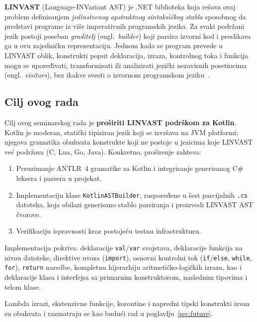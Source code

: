 \documentclass[a4paper]{article}
\begin{document}
\vspace{2px}
\textbf{LINVAST} (Language-INVariant AST) je .NET biblioteka koja rešava
ovaj problem definisanjem \emph{jedinstvenog apstraktnog sintaksičkog stabla}
sposobnog da predstavi programe iz više imperativnih programskih jezika. Za svaki
podržani jezik postoji poseban \emph{graditelj} (engl.\ \emph{builder}) koji
parsira izvorni kod i preslikava ga u ovu zajedničku reprezentaciju. Jednom kada
se program prevede u LINVAST oblik, konstrukti poput deklaracija, izraza,
kontrolnog toka i funkcija mogu se upoređivati, transformisati ili analizirati
jezički nezavisnih posetiocima (engl.\ \emph{visitors}), bez ikakve svesti o
izvornom programskom jeziku~\cite{ristovic2020}.

\subsection{Cilj ovog rada}

Cilj ovog seminarskog rada je \textbf{proširiti LINVAST podrškom za Kotlin}.
Kotlin je moderan, statički tipiziran jezik koji se izvršava na JVM platformi;
njegova gramatika obuhvata konstrukte koji ne postoje u jezicima koje LINVAST
već podržava (C, Lua, Go, Java). Konkretno, proširenje zahteva:

\begin{enumerate}
    \item Preuzimanje ANTLR~4 gramatike za Kotlin i integrisanje generisanog
          C\# leksera i parsera u projekat.
    \item Implementaciju klase \texttt{KotlinASTBuilder}, raspoređene u šest
          parcijalnih \texttt{.cs} datoteka, koja obilazi generisano stablo
          parsiranja i proizvodi LINVAST AST čvorove.
    \item Verifikaciju ispravnosti kroz postojeću testnu infrastrukturu.
\end{enumerate}

Implementacija pokriva: deklaracije \texttt{val}/\texttt{var}
svojstava, deklaracije funkcija na nivou datoteke, direktive uvoza
(\texttt{import}), osnovni kontrolni tok (\texttt{if}/\texttt{else},
\texttt{while}, \texttt{for}), \texttt{return} naredbe, kompletnu hijerarhiju
aritmetičko-logičkih izraza, kao i deklaracije klasa i interfejsa sa primarnim
konstruktorom, naslednim tipovima i telom klase. 

Lambda izrazi, ekstenzivne funkcije, koroutine i napredni tipski konstrukti izvan su obuhvata
i razmatraju se kao budući rad u poglavlju~\ref{sec:future}.
\end{document}
